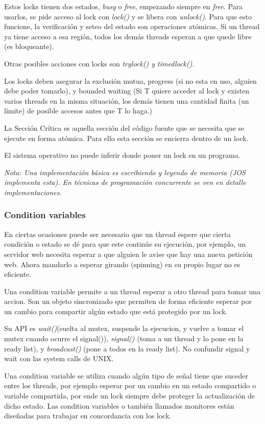 \documentclass[titlepage,a4paper]{article}
\begin{document}
Estos locks tienen dos estados, \textit{busy} o \textit{free}, empezando siempre en \textit{free}. Para usarlos, se pide acceso al lock con \textit{lock()} y se libera con \textit{unlock()}.
Para que esto funcione, la verificación y seteo del estado son operaciones atómicas. Si un thread ya tiene acceso a esa región, todos los demás threads esperan a que quede libre (es bloqueante).

Otras posibles acciones con locks son \textit{trylock() y timedlock()}.

Los locks deben asegurar la exclusión mutua, progress (si no esta en uso, alguien debe poder tomarlo), y bounded waiting (Si T quiere acceder al lock y existen varios threads en la misma situación, los demás tienen una cantidad finita (un límite) de posible accesos antes que T lo haga.)

La Sección Crítica es aquella sección del código fuente que se necesita que se ejecute en forma atómica. Para ello esta sección se encierra dentro de un lock.

El sistema operativo no puede inferir donde poner un lock en un programa.

\textit{Nota: Una implementación básica es escribiendo y leyendo de memoria (JOS implementa esta). En técnicas de programación concurrente se ven en detalle implementaciones.}

\subsubsection*{Condition variables}
En ciertas ocasiones puede ser necesario que un thread espere que cierta condición o estado se dé para que este continúe su ejecución, por ejemplo, un servidor web necesita esperar a que alguien le avise que hay una nueva petición web. Ahora mandarlo a esperar girando (spinning) en su propio lugar no es eficiente.

Una condition variable permite a un thread esperar a otro thread para tomar una accion. Son un objeto sincronizado que permiten de forma eficiente esperar por un cambio para compartir algún estado que está protegido por un lock.

Su API es \emph{wait()}(suelta al mutex, suspende la ejecucion, y vuelve a tomar el mutex cuando ocurre el signal()), \emph{signal()} (toma a un thread y lo pone en la ready list), y \emph{broadcast()} (pone a todos en la ready list). No confundir signal y wait con las system calls de UNIX.

Una condition variable se utiliza cuando algún tipo de señal tiene que suceder entre los threads, por ejemplo esperar por un cambio en un estado compartido o variable compartida, por ende un lock siempre debe proteger la actualización de dicho estado. Las condition variables o también llamados monitores están diseñadas para trabajar en concordancia con los lock.
\end{document}
